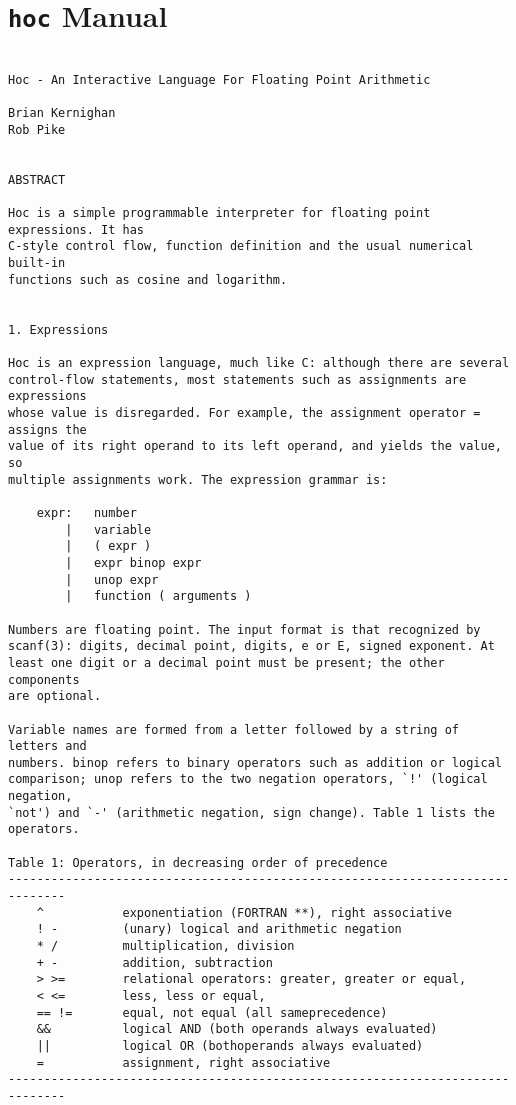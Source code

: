 \chapter{\texttt{hoc} Manual}

\begin{verbatim}

Hoc - An Interactive Language For Floating Point Arithmetic

Brian Kernighan
Rob Pike


ABSTRACT

Hoc is a simple programmable interpreter for floating point expressions. It has
C-style control flow, function definition and the usual numerical built-in
functions such as cosine and logarithm.


1. Expressions

Hoc is an expression language, much like C: although there are several
control-flow statements, most statements such as assignments are expressions
whose value is disregarded. For example, the assignment operator = assigns the
value of its right operand to its left operand, and yields the value, so
multiple assignments work. The expression grammar is:

    expr:   number
        |   variable
        |   ( expr )
        |   expr binop expr
        |   unop expr
        |   function ( arguments )
        
Numbers are floating point. The input format is that recognized by
scanf(3): digits, decimal point, digits, e or E, signed exponent. At
least one digit or a decimal point must be present; the other components
are optional.

Variable names are formed from a letter followed by a string of letters and
numbers. binop refers to binary operators such as addition or logical
comparison; unop refers to the two negation operators, `!' (logical negation,
`not') and `-' (arithmetic negation, sign change). Table 1 lists the operators.

Table 1: Operators, in decreasing order of precedence
------------------------------------------------------------------------------
    ^           exponentiation (FORTRAN **), right associative 
    ! -         (unary) logical and arithmetic negation
    * /         multiplication, division 
    + -         addition, subtraction 
    > >=        relational operators: greater, greater or equal,
    < <=        less, less or equal,
    == !=       equal, not equal (all sameprecedence) 
    &&          logical AND (both operands always evaluated) 
    ||          logical OR (bothoperands always evaluated) 
    =           assignment, right associative
------------------------------------------------------------------------------


\end{verbatim}
